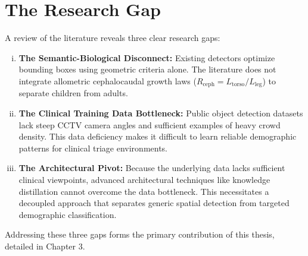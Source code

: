 \section{The Research Gap}
A review of the literature reveals three clear research gaps:
\begin{enumerate}[(i)]
    \item \textbf{The Semantic-Biological Disconnect:} Existing detectors optimize bounding boxes using geometric criteria alone. The literature does not integrate allometric cephalocaudal growth laws ($R_{\text{ceph}} = L_{\text{torso}}/L_{\text{leg}}$) to separate children from adults.
    \item \textbf{The Clinical Training Data Bottleneck:} Public object detection datasets lack steep CCTV camera angles and sufficient examples of heavy crowd density. This data deficiency makes it difficult to learn reliable demographic patterns for clinical triage environments.
    \item \textbf{The Architectural Pivot:} Because the underlying data lacks sufficient clinical viewpoints, advanced architectural techniques like knowledge distillation cannot overcome the data bottleneck. This necessitates a decoupled approach that separates generic spatial detection from targeted demographic classification.
\end{enumerate}

Addressing these three gaps forms the primary contribution of this thesis, detailed in Chapter 3.